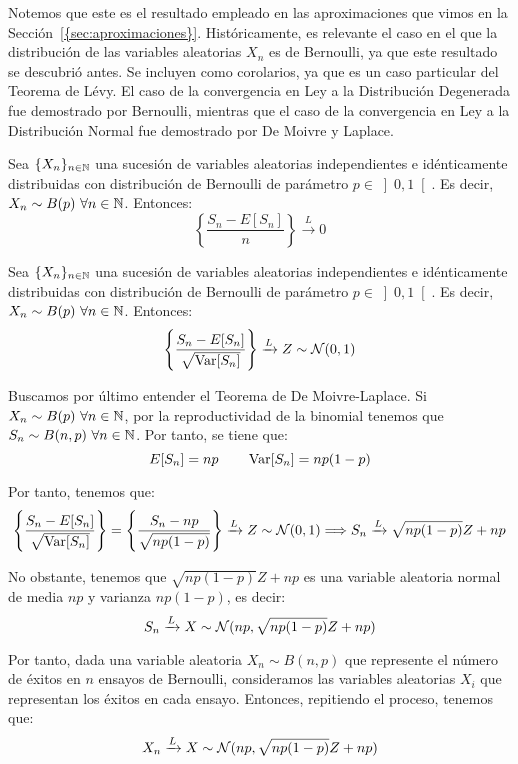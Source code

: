 Notemos que este es el resultado empleado en las aproximaciones que vimos en la Sección~\ref{{sec:aproximaciones}}.
Históricamente, es relevante el caso en el que la distribución de las variables aleatorias $X_n$ es de Bernoulli, ya que este resultado se descubrió antes. Se incluyen como corolarios, ya que es un caso particular del Teorema de Lévy. El caso de la convergencia en Ley a la Distribución Degenerada fue demostrado por Bernoulli, mientras que el caso de la convergencia en Ley a la Distribución Normal fue demostrado por De Moivre y Laplace.
\begin{coro}
    Sea $\{X_n\}_{n\in \mathbb{N}}$ una sucesión de variables aleatorias independientes e idénticamente distribuidas con distribución de Bernoulli de parámetro $p\in \left]0,1\right[$. Es decir, $X_n\sim B(p)~\forall n\in \mathbb{N}$. Entonces:
    \begin{equation*}
        \left\{\frac{S_n - E[S_n]}{n}\right\} \xrightarrow{L} 0
    \end{equation*}
\end{coro}
\begin{coro}\label{coro:teorema_de_moivre_laplace}
    Sea $\{X_n\}_{n\in \mathbb{N}}$ una sucesión de variables aleatorias independientes e idénticamente distribuidas con distribución de Bernoulli de parámetro $p\in \left]0,1\right[$. Es decir, $X_n\sim B(p)~\forall n\in \mathbb{N}$. Entonces:
    \begin{equation*}
        \left\{\frac{S_n - E[S_n]}{\sqrt{\operatorname{Var}[S_n]}}\right\} \xrightarrow{L} Z\sim \mathcal{N}(0,1)
    \end{equation*}
\end{coro}

Buscamos por último entender el Teorema de De Moivre-Laplace. Si $X_n\sim B(p)~\forall n\in \mathbb{N}$, por la reproductividad de la binomial tenemos que $S_n\sim B(n,p)~\forall n\in \mathbb{N}$. Por tanto, se tiene que:
\begin{equation*}
    E[S_n] = np\qquad \operatorname{Var}[S_n] = np(1-p)
\end{equation*}

Por tanto, tenemos que:
\begin{equation*}
    \left\{\frac{S_n - E[S_n]}{\sqrt{\operatorname{Var}[S_n]}}\right\} = \left\{\frac{S_n - np}{\sqrt{np(1-p)}}\right\} \xrightarrow{L} Z\sim \mathcal{N}(0,1)
    \Longrightarrow S_n \xrightarrow{L} \sqrt{np(1-p)}Z + np
\end{equation*}

No obstante, tenemos que $\sqrt{np(1-p)}Z + np$ es una variable aleatoria normal de media $np$ y varianza $np(1-p)$, es decir:
\begin{equation*}
    S_n \xrightarrow{L} X\sim \mathcal{N}(np, \sqrt{np(1-p)}Z + np)
\end{equation*}

Por tanto, dada una variable aleatoria $X_n\sim B(n,p)$ que represente el número de éxitos en $n$ ensayos de Bernoulli, consideramos las variables aleatorias $X_i$ que representan los éxitos en cada ensayo. Entonces, repitiendo el proceso, tenemos que:
\begin{equation*}
    X_n \xrightarrow{L} X\sim \mathcal{N}(np, \sqrt{np(1-p)}Z + np)
\end{equation*}